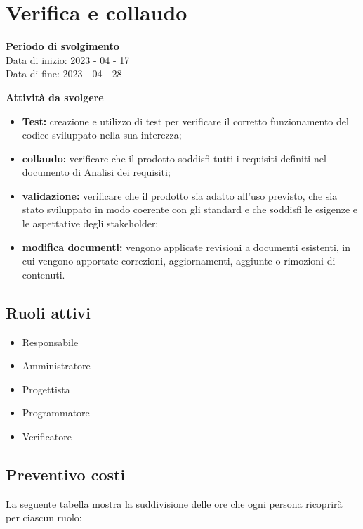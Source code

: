 \section{Verifica e collaudo}

\textbf{Periodo di svolgimento}
\\ Data di inizio: 2023 - 04 - 17 \\ Data di fine: 2023 - 04 - 28

\textbf{Attività da svolgere}
    \begin{itemize}
        \item \textbf{Test:} creazione e utilizzo di test per verificare il corretto funzionamento del codice sviluppato nella sua interezza; 
        \item \textbf{collaudo:} verificare che il prodotto soddisfi tutti i requisiti definiti nel documento di Analisi dei requisiti;
        \item \textbf{validazione:} verificare che il prodotto sia adatto all'uso previsto, che sia stato sviluppato in modo coerente con gli standard e che soddisfi le esigenze e le aspettative degli stakeholder;
        \item \textbf{modifica documenti:} vengono applicate revisioni a documenti esistenti, in cui vengono apportate correzioni, aggiornamenti, aggiunte o rimozioni di contenuti.
    \end{itemize}

\subsection{Ruoli attivi}
\begin{itemize}
    \item Responsabile 
    \item Amministratore 
    \item Progettista 
    \item Programmatore 
    \item Verificatore 
\end{itemize}

\subsection{Preventivo costi}

La seguente tabella mostra la suddivisione delle ore che ogni persona ricoprirà per ciascun ruolo:

